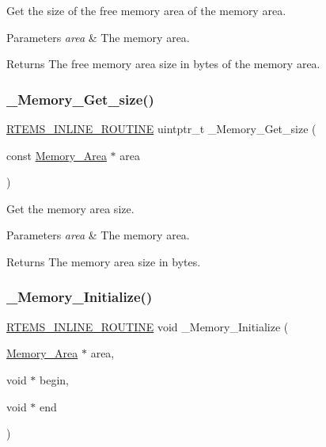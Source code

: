 Get the size of the free memory area of the memory area. 


\begin{DoxyParams}{Parameters}
{\em area} & The memory area.\\
\hline
\end{DoxyParams}
\begin{DoxyReturn}{Returns}
The free memory area size in bytes of the memory area. 
\end{DoxyReturn}
\mbox{\label{group__RTEMSScoreMemory_ga8c9568988e1a8d39af22e1bc76a55cf1}} 
\subsubsection{\texorpdfstring{\_Memory\_Get\_size()}{\_Memory\_Get\_size()}}
{\footnotesize\ttfamily \mbox{\hyperlink{group__RTEMSScoreBaseDefs_gac216239df231d5dbd15e3520b0b9313f}{R\+T\+E\+M\+S\+\_\+\+I\+N\+L\+I\+N\+E\+\_\+\+R\+O\+U\+T\+I\+NE}} uintptr\+\_\+t \+\_\+\+Memory\+\_\+\+Get\+\_\+size (\begin{DoxyParamCaption}\item[{const \mbox{\hyperlink{structMemory__Area}{Memory\+\_\+\+Area}} $\ast$}]{area }\end{DoxyParamCaption})}



Get the memory area size. 


\begin{DoxyParams}{Parameters}
{\em area} & The memory area.\\
\hline
\end{DoxyParams}
\begin{DoxyReturn}{Returns}
The memory area size in bytes. 
\end{DoxyReturn}
\mbox{\label{group__RTEMSScoreMemory_ga0b6ffdf3dc891d567fce86ae80a0b7e3}} 
\subsubsection{\texorpdfstring{\_Memory\_Initialize()}{\_Memory\_Initialize()}}
{\footnotesize\ttfamily \mbox{\hyperlink{group__RTEMSScoreBaseDefs_gac216239df231d5dbd15e3520b0b9313f}{R\+T\+E\+M\+S\+\_\+\+I\+N\+L\+I\+N\+E\+\_\+\+R\+O\+U\+T\+I\+NE}} void \+\_\+\+Memory\+\_\+\+Initialize (\begin{DoxyParamCaption}\item[{\mbox{\hyperlink{structMemory__Area}{Memory\+\_\+\+Area}} $\ast$}]{area,  }\item[{void $\ast$}]{begin,  }\item[{void $\ast$}]{end }\end{DoxyParamCaption})}



